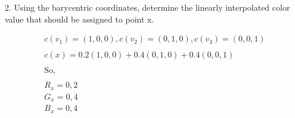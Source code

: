 \documentclass[10pt,a4paper]{article}
\begin{document}
\begin{flushleft}
2. Using the barycentric coordinates, determine the linearly interpolated color value that should be assigned to point x.
\end{flushleft}

\begin{gather*}
c(v_1) = (1,0,0), c(v_2) = (0,1,0), c(v_3) = (0,0,1) \\ \\
c(x) = 0.2(1,0,0) + 0.4(0,1,0) + 0.4(0,0,1) \\ \\
\text{So,} \\ \\
R_x = 0,2 \\
G_x = 0,4 \\
B_x = 0,4 \\
\end{gather*}
\end{document}
